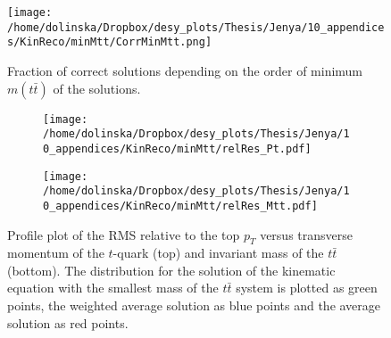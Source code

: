 \begin{figure}[t]
  \centering
  \texttt{[image: /home/dolinska/Dropbox/desy\_plots/Thesis/Jenya/10\_appendices/KinReco/minMtt/CorrMinMtt.png]}
  \caption{Fraction of correct solutions depending on the order of minimum $m(t\bar{t})$ of the solutions.}
  \label{fig:corrMinMtt}
\end{figure}

\begin{figure}[h]
\centering
\begin{subfigure}
  \centering
  \texttt{[image: /home/dolinska/Dropbox/desy\_plots/Thesis/Jenya/10\_appendices/KinReco/minMtt/relRes\_Pt.pdf]}
\end{subfigure}
\begin{subfigure}
  \centering
  \texttt{[image: /home/dolinska/Dropbox/desy\_plots/Thesis/Jenya/10\_appendices/KinReco/minMtt/relRes\_Mtt.pdf]}
\end{subfigure}
\caption{Profile plot of the RMS relative to the top $p_{T}$ versus transverse momentum of the $t$-quark (top) and invariant mass of the $t\bar{t}$ (bottom). The distribution for the
         solution of the kinematic equation with the smallest mass of the $t\bar{t}$ system is plotted as green points, the weighted average solution as blue points and the average 
         solution as red points.}
\label{fig:Absvs}
\end{figure}